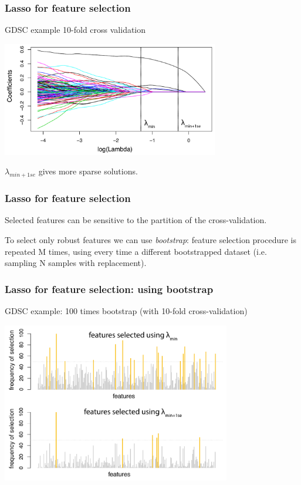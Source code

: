 \documentclass[notes]{beamer}          %
\begin{document}
\begin{frame}
\frametitle{Lasso for feature selection}
GDSC example 10-fold cross validation

\begin{center}
\includegraphics[height=5cm]{../figures/week_2_linear_models/Lasso_feature_selection.pdf}
\end{center}

$\lambda_{min+1se}$ gives more sparse solutions.

\end{frame}


\begin{frame}
\frametitle{Lasso for feature selection}

Selected features can be sensitive to the partition of the cross-validation.

\vspace{5mm} 

To select only robust features we can use \textit{bootstrap}: feature selection procedure is repeated M times, using every time a different bootstrapped dataset (i.e. sampling N samples with replacement).

\end{frame}


\begin{frame}
\frametitle{Lasso for feature selection: using bootstrap}
GDSC example: 100 times bootstrap (with 10-fold cross-validation)

\begin{center}
\includegraphics[height=7cm]{../figures/week_2_linear_models/Lasso_feature_selection_bootstrap.pdf}
\end{center}

\end{frame}
\end{document}
